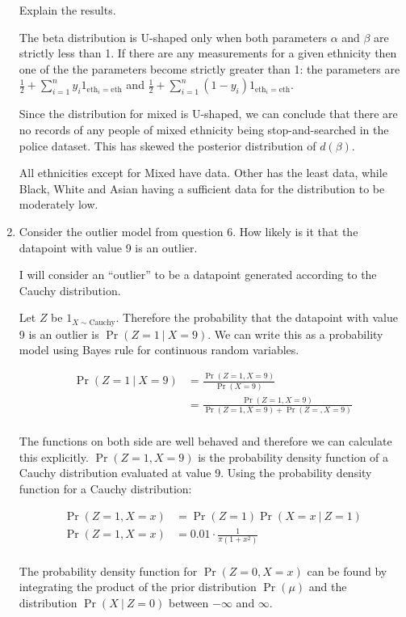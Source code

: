 \documentclass[10pt,\jkfside,a4paper]{article}
\begin{document}
\begin{enumerate}
Explain the results.

The beta distribution is U-shaped only when both parameters $\alpha$ and
$\beta$ are strictly less than 1. If there are any measurements for a given
ethnicity then one of the the parameters become strictly greater than 1: the
parameters are $\frac{1}{2} + \sum^n_{i=1}y_{i}1_{\text{eth}_i=\text{eth}}$
and $\frac{1}{2} + \sum^n_{i=1}(1 - y_i)1_{\text{eth}_i=\text{eth}}$.

Since the distribution for mixed is U-shaped, we can conclude that there are
no records of any people of mixed ethnicity being stop-and-searched in the
police dataset. This has skewed the posterior distribution of $d(\beta)$.

All ethnicities except for Mixed have data. Other has the least data, while
Black, White and Asian having a sufficient data for the
distribution to be moderately low.

\item Consider the outlier model from question 6. How likely is it that the
datapoint with value 9 is an outlier.

I will consider an ``outlier'' to be a datapoint generated according to the
Cauchy distribution.

Let $Z$ be $1_{X \sim \text{Cauchy}}$. Therefore the probability that the
datapoint with value 9 is an outlier is $\Pr(Z=1 \ | \ X=9)$. We can write this as
a probability model using Bayes rule for continuous random variables.

\[
\begin{split}
\Pr(Z=1 \ | \ X=9) &= \frac{\Pr(Z=1, X=9)}{\Pr(X=9)} \\
			 &= \frac{\Pr(Z=1, X=9)}{\Pr(Z=1, X=9) + \Pr(Z=, X=9)} \\
\end{split}
\]

The functions on both side are well behaved and therefore we can calculate
this explicitly. $\Pr(Z=1, X=9)$ is the probability density function of a
Cauchy distribution evaluated at value 9. Using the probability density
function for a Cauchy distribution:

\[
\begin{split}
\Pr(Z=1, X=x) &= \Pr(Z=1)\Pr(X=x \ | \ Z=1) \\
\Pr(Z=1, X=x) &= 0.01\cdot\frac{1}{\pi(1 + x^2)} \\
\end{split}
\]

The probability density function for $\Pr(Z=0, X=x)$ can be found by
integrating the product of the prior distribution $\Pr(\mu)$ and the
distribution $\Pr(X \ | \ Z=0)$ between $-\infty$ and $\infty$.


\end{enumerate}
\end{document}
